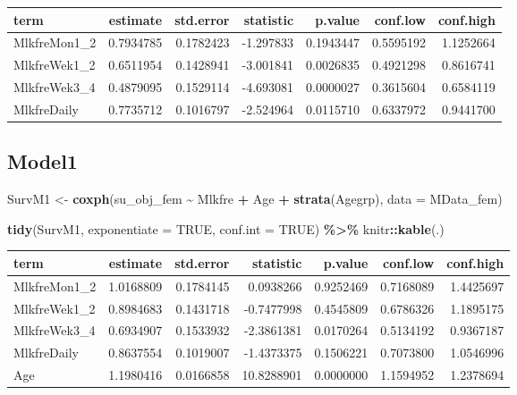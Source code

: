\documentclass[
]{article}
\newenvironment{Shaded}{\begin{snugshade}}{\end{snugshade}}
\newcommand{\DataTypeTok}[1]{\textcolor[rgb]{0.13,0.29,0.53}{#1}}
\newcommand{\KeywordTok}[1]{\textcolor[rgb]{0.13,0.29,0.53}{\textbf{#1}}}
\newcommand{\NormalTok}[1]{#1}
\newcommand{\OperatorTok}[1]{\textcolor[rgb]{0.81,0.36,0.00}{\textbf{#1}}}
\newcommand{\OtherTok}[1]{\textcolor[rgb]{0.56,0.35,0.01}{#1}}
\newcommand{\StringTok}[1]{\textcolor[rgb]{0.31,0.60,0.02}{#1}}
\begin{document}
\begin{longtable}[]{@{}lrrrrrr@{}}
\toprule
term & estimate & std.error & statistic & p.value & conf.low &
conf.high\tabularnewline
\midrule
\endhead
MlkfreMon1\_2 & 0.7934785 & 0.1782423 & -1.297833 & 0.1943447 &
0.5595192 & 1.1252664\tabularnewline
MlkfreWek1\_2 & 0.6511954 & 0.1428941 & -3.001841 & 0.0026835 &
0.4921298 & 0.8616741\tabularnewline
MlkfreWek3\_4 & 0.4879095 & 0.1529114 & -4.693081 & 0.0000027 &
0.3615604 & 0.6584119\tabularnewline
MlkfreDaily & 0.7735712 & 0.1016797 & -2.524964 & 0.0115710 & 0.6337972
& 0.9441700\tabularnewline
\bottomrule
\end{longtable}

\hypertarget{model1-10}{%
\subsection{Model1}\label{model1-10}}

\begin{Shaded}
\begin{Highlighting}[]
\NormalTok{SurvM1 \textless{}{-}}\StringTok{  }\KeywordTok{coxph}\NormalTok{(su\_obj\_fem }\OperatorTok{\textasciitilde{}}\StringTok{ }\NormalTok{Mlkfre }\OperatorTok{+}\StringTok{ }\NormalTok{Age }\OperatorTok{+}\StringTok{ }\KeywordTok{strata}\NormalTok{(Agegrp), }
                 \DataTypeTok{data =}\NormalTok{ MData\_fem)}

\KeywordTok{tidy}\NormalTok{(SurvM1, }\DataTypeTok{exponentiate =} \OtherTok{TRUE}\NormalTok{, }\DataTypeTok{conf.int =} \OtherTok{TRUE}\NormalTok{) }\OperatorTok{\%\textgreater{}\%}\StringTok{ }
\StringTok{  }\NormalTok{knitr}\OperatorTok{::}\KeywordTok{kable}\NormalTok{(.)}
\end{Highlighting}
\end{Shaded}

\begin{longtable}[]{@{}lrrrrrr@{}}
\toprule
term & estimate & std.error & statistic & p.value & conf.low &
conf.high\tabularnewline
\midrule
\endhead
MlkfreMon1\_2 & 1.0168809 & 0.1784145 & 0.0938266 & 0.9252469 &
0.7168089 & 1.4425697\tabularnewline
MlkfreWek1\_2 & 0.8984683 & 0.1431718 & -0.7477998 & 0.4545809 &
0.6786326 & 1.1895175\tabularnewline
MlkfreWek3\_4 & 0.6934907 & 0.1533932 & -2.3861381 & 0.0170264 &
0.5134192 & 0.9367187\tabularnewline
MlkfreDaily & 0.8637554 & 0.1019007 & -1.4373375 & 0.1506221 & 0.7073800
& 1.0546996\tabularnewline
Age & 1.1980416 & 0.0166858 & 10.8288901 & 0.0000000 & 1.1594952 &
1.2378694\tabularnewline
\bottomrule
\end{longtable}
\end{document}
